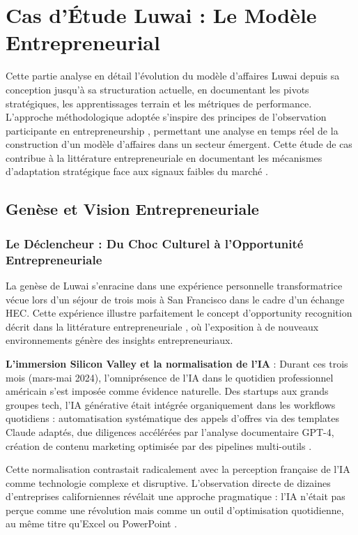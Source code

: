 \chapter{Cas d'Étude Luwai : Le Modèle Entrepreneurial}
\label{chap:luwai_case_study}

Cette partie analyse en détail l'évolution du modèle d'affaires Luwai depuis sa conception jusqu'à sa structuration actuelle, en documentant les pivots stratégiques, les apprentissages terrain et les métriques de performance. L'approche méthodologique adoptée s'inspire des principes de l'observation participante en entrepreneurship \cite{gartner1985conceptual}, permettant une analyse en temps réel de la construction d'un modèle d'affaires dans un secteur émergent. Cette étude de cas contribue à la littérature entrepreneuriale en documentant les mécanismes d'adaptation stratégique face aux signaux faibles du marché \cite{eisenhardt1989building}.

\section{Genèse et Vision Entrepreneuriale}

\subsection{Le Déclencheur : Du Choc Culturel à l'Opportunité Entrepreneuriale}

La genèse de Luwai s'enracine dans une expérience personnelle transformatrice vécue lors d'un séjour de trois mois à San Francisco dans le cadre d'un échange HEC. Cette expérience illustre parfaitement le concept d'opportunity recognition décrit dans la littérature entrepreneuriale \cite{shane2000prior}, où l'exposition à de nouveaux environnements génère des insights entrepreneuriaux.

\textbf{L'immersion Silicon Valley et la normalisation de l'IA} : Durant ces trois mois (mars-mai 2024), l'omniprésence de l'IA dans le quotidien professionnel américain s'est imposée comme évidence naturelle. Des startups aux grands groupes tech, l'IA générative était intégrée organiquement dans les workflows quotidiens : automatisation systématique des appels d'offres via des templates Claude adaptés, due diligences accélérées par l'analyse documentaire GPT-4, création de contenu marketing optimisée par des pipelines multi-outils \cite{brynjolfsson2023performance}.

Cette normalisation contrastait radicalement avec la perception française de l'IA comme technologie complexe et disruptive. L'observation directe de dizaines d'entreprises californiennes révélait une approche pragmatique : l'IA n'était pas perçue comme une révolution mais comme un outil d'optimisation quotidienne, au même titre qu'Excel ou PowerPoint \cite{mcafee2023productivity}.

